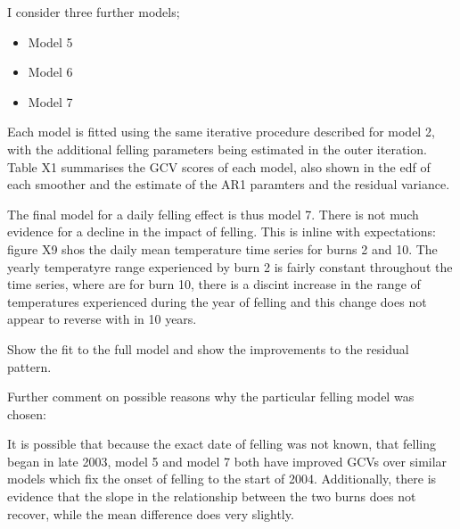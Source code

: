I consider three further models;
\begin{itemize}
\item Model 5
\item Model 6
\item Model 7
\end{itemize}

Each model is fitted using the same iterative procedure described for model 2, with the additional felling parameters being estimated in the outer iteration.  Table X1 summarises the GCV scores of each model, also shown in the edf of each smoother and the estimate of the AR1 paramters and the residual variance.

The final model for a daily felling effect is thus model 7.  There is not much evidence for a decline in the impact of felling.  This is inline with expectations: figure X9 shos the daily mean temperature time series for burns 2 and 10.  The yearly temperatyre range experienced by burn 2 is fairly constant throughout the time series, where are for burn 10, there is a discint increase in the range of temperatures experienced during the year of felling and this change does not appear to reverse with in 10 years.

Show the fit to the full model and show the improvements to the residual pattern.  

Further comment on possible reasons why the particular felling model was chosen:  

It is possible that because the exact date of felling was not known, that felling began in late 2003, model 5 and model 7 both have improved GCVs  over similar models which fix the onset of felling to the start of 2004.  Additionally, there is evidence that the slope in the relationship between the two burns does not recover, while the mean difference does very slightly.



